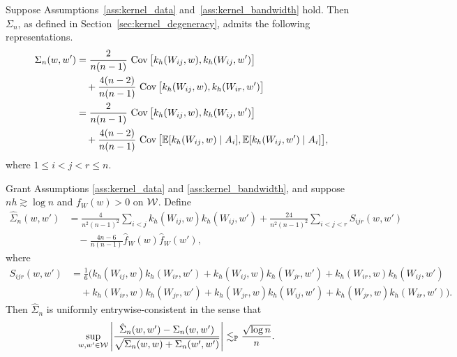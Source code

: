 \begin{lemma}
  \label{lem:kernel_app_covariance_structure}

  Suppose Assumptions~\ref{ass:kernel_data} and~\ref{ass:kernel_bandwidth}
  hold. Then $\Sigma_n$, as defined in Section~\ref{sec:kernel_degeneracy},
  admits the
  following representations.
  \begin{align*}
    \Sigma_n(w,w')
    &=
    \frac{2}{n(n-1)}
    \,\operatorname{Cov}\big[
      k_h(W_{i j},w),
      k_h(W_{i j},w')
    \big] \\
    &\quad+
    \frac{4(n-2)}{n(n-1)}
    \,\operatorname{Cov}\big[
      k_h(W_{i j},w),
      k_h(W_{i r},w')
    \big] \\
    &=
    \frac{2}{n(n-1)}
    \,\operatorname{Cov}\big[
      k_h(W_{i j},w),
      k_h(W_{i j},w')
    \big] \\
    &\quad+
    \frac{4(n-2)}{n(n-1)}
    \,\operatorname{Cov}\big[
      \mathbb{E}[k_h(W_{i j},w) \mid A_i],
      \mathbb{E}[k_h(W_{i j},w') \mid A_i]
    \big],
  \end{align*}
  where $1 \leq i < j < r \leq n$.

\end{lemma}

\begin{lemma}
  \label{lem:kernel_app_covariance_estimation}

  Grant Assumptions \ref{ass:kernel_data} and \ref{ass:kernel_bandwidth},
  and suppose $n h \gtrsim \log n$ and $f_W(w) > 0$ on $\mathcal{W}$. Define
  \begin{align*}
    \hat \Sigma_n(w,w')
    &=
    \frac{4}{n^2(n-1)^2}
    \sum_{i<j}
    k_h(W_{i j},w)
    k_h(W_{i j},w')
    +
    \frac{24}{n^2(n-1)^2}
    \sum_{i<j<r}
    S_{i j r}(w,w') \\
    &\quad-
    \frac{4n-6}{n(n-1)}
    \hat f_W(w)
    \hat f_W(w'),
  \end{align*}
  where
  \begin{align*}
    S_{i j r}(w,w')
    &=
    \frac{1}{6}
    \Big(
      k_h(W_{i j},w)
      k_h(W_{i r},w')
      + k_h(W_{i j},w)
      k_h(W_{jr},w')
      + k_h(W_{i r},w)
      k_h(W_{i j},w') \\
      &\quad+
      k_h(W_{i r},w)
      k_h(W_{jr},w')
      + k_h(W_{jr},w)
      k_h(W_{i j},w')
      + k_h(W_{jr},w)
      k_h(W_{i r},w')
    \Big).
  \end{align*}
  Then $\hat \Sigma_n$
  is uniformly entrywise-consistent in the sense that
  \begin{align*}
    \sup_{w,w' \in \mathcal{W}}
    \left|
    \frac{\hat \Sigma_n(w,w') - \Sigma_n(w,w')}
    {\sqrt{\Sigma_n(w,w) + \Sigma_n(w',w')}}
    \right|
    &\lesssim_{\mathbb{P}}
    \frac{\sqrt{\log n}}{n}.
  \end{align*}

\end{lemma}

